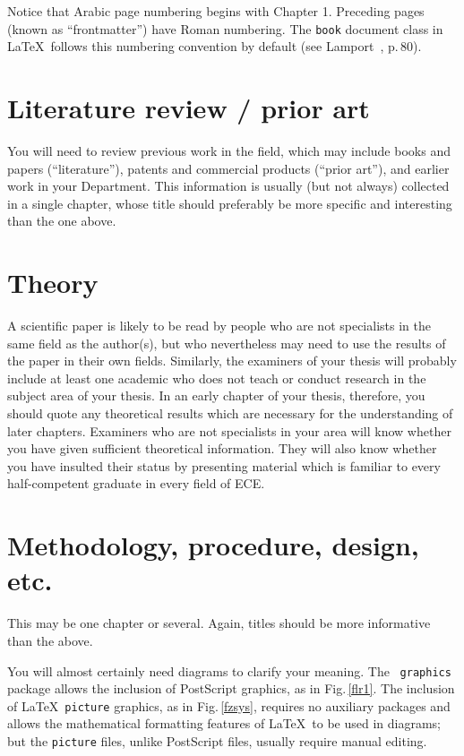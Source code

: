 \documentclass[12pt,openany,a4paper]{book}
\newcommand{\fig}[1]  {Fig.\,\ref{#1}}		%
\begin{document}
Notice that Arabic page numbering begins with Chapter 1.  Preceding
pages (known as ``frontmatter'') have Roman numbering.  The
\texttt{book} document class in \LaTeX\ follows this numbering
convention by default (see Lamport~\cite{lamport}, p.\,80).

\chapter{Literature review / prior art}

You will need to review previous work in the field, which may include
books and papers (``literature''), patents and commercial products
(``prior art''), and earlier work in your Department.  This
information is usually (but not always) collected in a single chapter,
whose title should preferably be more specific and interesting than
the one above.

\chapter{Theory}

A scientific paper is likely to be read by people who are not
specialists in the same field as the author(s), but who nevertheless
may need to use the results of the paper in their own fields.
Similarly, the examiners of your thesis will probably include at least
one academic who does not teach or conduct research in the subject
area of your thesis.  In an early chapter of your thesis, therefore,
you should quote any theoretical results which are necessary for the
understanding of later chapters.  Examiners who are not specialists in
your area will know whether you have given sufficient theoretical
information.  They will also know whether you have insulted their
status by presenting material which is familiar to every
half-competent graduate in every field of ECE.

\chapter{Methodology, procedure, design, etc.}

This may be one chapter or several.  Again, titles should be more
informative than the above.

You will almost certainly need diagrams to clarify your meaning.  The
\LaTeXe\ \texttt{graphics} package allows the inclusion of PostScript
graphics, as in \fig{flr1}.  The inclusion of \LaTeX\ \texttt{picture}
graphics, as in \fig{fzsys}, requires no auxiliary packages and allows
the mathematical formatting features of \LaTeX\ to be used in
diagrams; but the \texttt{picture} files, unlike PostScript files,
usually require manual editing.
\end{document}
